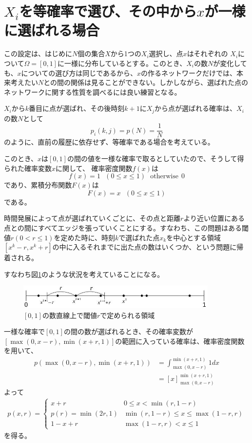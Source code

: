 \section{$X_{i}$を等確率で選び、その中から$x$が一様に選ばれる場合}

この設定は、はじめに$N$個の集合$X$から1つの$X_{i}$選択し、点$x$はそれぞれの $X_{i}$について$\Omega = [0,1]$に一様に分布しているとする。このとき、$X_{i}$の数$N$が変化しても、$x$についての選び方は同じであるから、$x$の作るネットワークだけでは、本来考えたい$N$との間の関係は見ることができない。しかしながら、選ばれた点のネットワークに関する性質を調べるには良い練習となる。

$X_{i}$から$k$番目に点が選ばれ、その後時刻$k+1$に$X_{j}$から点が選ばれる確率は、$X_{i}$の数$N$として
\[p_{i}(k,j) = p(N) = \frac{1}{N}\]
のように、直前の履歴に依存せず、等確率である場合を考えている。

このとき、$x$は$[0,1]$の間の値を一様な確率で取るとしていたので、そうして得られた確率変数$x$に関して、
確率密度関数$f(x)$は
\[f(x) = 1\ \ \ (0\le x \le 1)\ \ \ \text{otherwise}\ \ 0\]
であり、累積分布関数$F(x)$は
\[F(x) = x\ \ \ (0\le x \le 1)\]
である。

時間発展によって点が選ばれていくごとに、その点と距離$r$より近い位置にある点との間にすべてエッジを張っていくことにする。すなわち、この問題はある閾値$r(0<r\le1)$を定めた時に、時刻$k$で選ばれた点$x_{k}$を中心とする領域$[x^{k}-r, x^{k}+r]$の中に入るそれまでに出た点の数はいくつか、という問題に帰着される。

すなわち図\ref{fig:f2}のような状況を考えていることになる。
\begin{figure}[H]
    \begin{center}
        \includegraphics[width=10cm]{../simple1/simple001_1.jpg}
        \caption{$[0,1]$の数直線上で閾値$r$で定められる領域}
        \label{fig:f2}
    \end{center}
\end{figure}

一様な確率で$[0,1]$の間の数が選ばれるとき、その確率変数が$[\max(0,x-r), \min(x+r,1)]$の範囲に入っている確率は、確率密度関数を用いて、
\begin{align}
p(\max(0, x-r), \min(x+r, 1)) &= \int ^{\min(x+r,1)}_{\max(0, x-r)} 1 dx \nonumber \\
&= \left[ x\right]^{\min(x+r,1)}_{\max(0, x-r)}
\end{align}
よって
\begin{eqnarray}
p(x,r)= \left\{ \begin{array}{ll}x+r & 0\le x< \min(r,1-r) \nonumber \\
p(r) = \min(2r, 1) & \min(r, 1-r)\le x \le \max(1-r, r) \nonumber \\
1 - x+r & \max(1-r, r) < x \le 1
\end{array}\right.
\end{eqnarray}
を得る。

